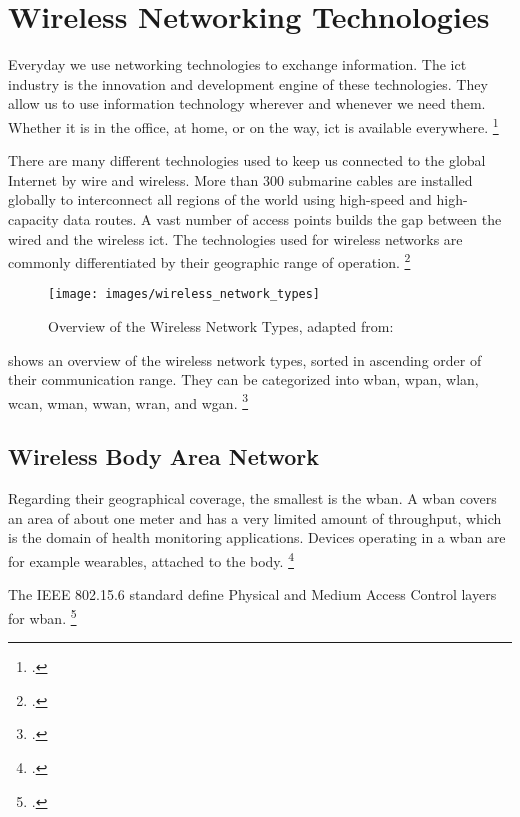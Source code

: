 \chapter{Wireless Networking Technologies}
\label{ch:wireless-networking}

Everyday we use networking technologies to exchange information. The \gls{ict} industry is the innovation and development engine of these technologies. They allow us to use information technology wherever and whenever we need them. Whether it is in the office, at home, or on the way, \gls{ict} is available everywhere. \footcite[Cf.][1]{Pahlavan2009}

There are many different technologies used to keep us connected to the global Internet by wire and wireless. More than 300 submarine cables are installed globally to interconnect all regions of the world using high-speed and high-capacity data routes. A vast number of access points builds the gap between the wired and the wireless \gls{ict}. The technologies used for wireless networks are commonly differentiated by their geographic range of operation. \footcite[Cf.][49--52]{Ephremides2013}

\begin{figure}[ht]
  \centering
  \texttt{[image: images/wireless\_network\_types]}
  \caption{Overview of the Wireless Network Types, adapted from: \cite[6]{Latre2011}}
  \label{fig:wireless-network-type}
\end{figure}

 shows an overview of the wireless network types, sorted in ascending order of their communication range. They can be categorized into \gls{wban}, \gls{wpan}, \gls{wlan}, \gls{wcan}, \gls{wman}, \gls{wwan}, \gls{wran}, and \gls{wgan}. \footcite[Cf.][6]{Latre2011}

\section{Wireless Body Area Network}

Regarding their geographical coverage, the smallest is the \gls{wban}. A \gls{wban} covers an area of about one meter and has a very limited amount of throughput, which is the domain of health monitoring applications. Devices operating in a \gls{wban} are for example wearables, attached to the body. \footcite[Cf.][1660]{Movassaghi2014}

The IEEE 802.15.6 standard define Physical and Medium Access Control layers for \gls{wban}. \footcite[Cf.][1]{Kwak2010}

